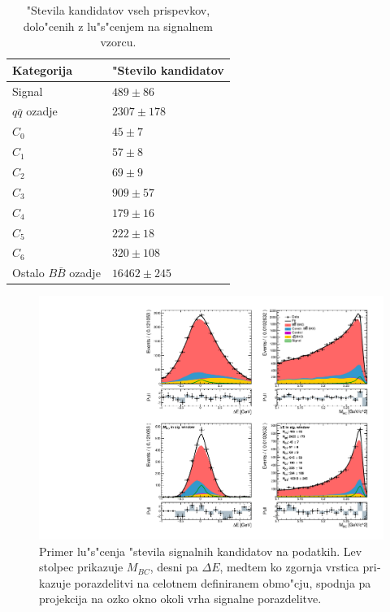 \begin{otherlanguage}{slovene}
\begin{table}[H]
	\centering
	\begin{tabular}{l|l}
		Kategorija & "Stevilo kandidatov \\
		\toprule
		Signal & $489 \pm 86$ \\
		$q \bar q$ ozadje & $ 2307 \pm 178 $ \\
		$C_0$ & $ 45 \pm 7 $ \\
		$C_1$ & $ 57 \pm 8 $\\
		$C_2$ & $ 69 \pm 9 $ \\
		$C_3$ & $ 909 \pm 57 $ \\
		$C_4$ & $ 179 \pm 16 $ \\
		$C_5$ & $ 222 \pm 18 $ \\
		$C_6$ & $ 320 \pm 108 $ \\
		Ostalo $B \bar B$ ozadje & $ 16462 \pm 245 $ \\
		\bottomrule
	\end{tabular}
	\captionsetup{width=.8\linewidth}
	\caption{"Stevila kandidatov vseh prispevkov, dolo"cenih z lu"s"cenjem na signalnem vzorcu.}
	\label{tab:sig_yields_si}
\end{table}

\begin{figure}[H]
	\centering
	\captionsetup{width=0.8\linewidth}
	\includegraphics[width=\linewidth]{fig/sig_fit_data}
	\caption{Primer lu"s"cenja "stevila signalnih kandidatov na podatkih. Lev stolpec prikazuje $M_{BC}$, desni pa $\Delta E$, medtem ko zgornja vrstica prikazuje porazdelitvi na celotnem definiranem obmo"cju, spodnja pa projekcija na ozko okno okoli vrha signalne porazdelitve.}
	\label{fig:sig_datafit_si}
\end{figure}


\end{otherlanguage}
